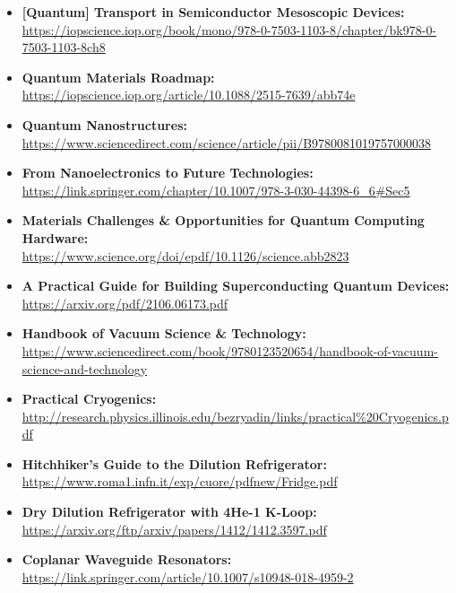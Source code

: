 \begin{itemize}
  \item\textbf{[Quantum] Transport in Semiconductor Mesoscopic Devices:}\\
\url{https://iopscience.iop.org/book/mono/978-0-7503-1103-8/chapter/bk978-0-7503-1103-8ch8}

  \item\textbf{Quantum Materials Roadmap:}\\
\url{https://iopscience.iop.org/article/10.1088/2515-7639/abb74e}

  \item\textbf{Quantum Nanostructures:}\\
\url{https://www.sciencedirect.com/science/article/pii/B9780081019757000038}

  \item\textbf{From Nanoelectronics to Future Technologies:}\\
\url{https://link.springer.com/chapter/10.1007/978-3-030-44398-6_6#Sec5}

  \item\textbf{Materials Challenges \& Opportunities for Quantum Computing Hardware:}\\
\url{https://www.science.org/doi/epdf/10.1126/science.abb2823}

  \item\textbf{A Practical Guide for Building Superconducting Quantum Devices:}\\
\url{https://arxiv.org/pdf/2106.06173.pdf}

  \item\textbf{Handbook of Vacuum Science \& Technology:}\\
\url{https://www.sciencedirect.com/book/9780123520654/handbook-of-vacuum-science-and-technology}

  \item\textbf{Practical Cryogenics:}\\
\url{http://research.physics.illinois.edu/bezryadin/links/practical%20Cryogenics.pdf}

  \item\textbf{Hitchhiker’s Guide to the Dilution Refrigerator:}\\
\url{https://www.roma1.infn.it/exp/cuore/pdfnew/Fridge.pdf}

  \item\textbf{Dry Dilution Refrigerator with 4He-1 K-Loop:}\\
\url{https://arxiv.org/ftp/arxiv/papers/1412/1412.3597.pdf}

  \item\textbf{Coplanar Waveguide Resonators:}\\
\url{https://link.springer.com/article/10.1007/s10948-018-4959-2}


\end{itemize}
